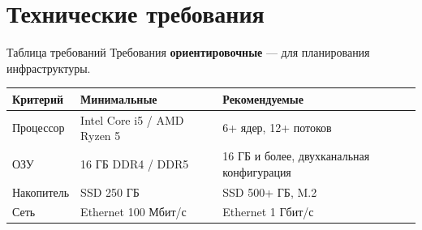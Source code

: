 \section{Технические требования}

\begin{frame}{Таблица требований\orient}
  \vspace{0.1em}
  {\footnotesize\color{acGray}Требования \textbf{ориентировочные} --- для планирования инфраструктуры.}
  \vspace{0.6em}

  \small
  \begin{tabular}{@{}p{}p{}p{}@{}}
    \toprule
    \textbf{Критерий} & \textbf{Минимальные} & \textbf{Рекомендуемые}\\
    \midrule
    Процессор & Intel Core i5 / AMD Ryzen 5 &
      6+ ядер, 12+ потоков \\
    \addlinespace[0.25em]
    ОЗУ & 16 ГБ DDR4 / DDR5 &
      16 ГБ и более, двухканальная конфигурация \\
    \addlinespace[0.25em]
    Накопитель & SSD 250 ГБ &
      SSD 500+ ГБ, M.2 \\
    \addlinespace[0.25em]
    Сеть & Ethernet 100 Мбит/с & Ethernet 1 Гбит/с \\
    \bottomrule
  \end{tabular}

\end{frame}
